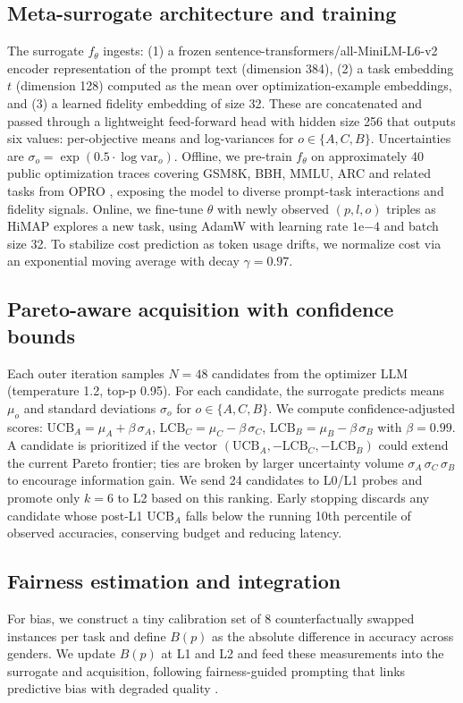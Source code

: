 \documentclass{article}
\begin{document}
\subsection{Meta-surrogate architecture and training}
The surrogate \(f_{\theta}\) ingests: (1) a frozen sentence-transformers/all-MiniLM-L6-v2 encoder representation of the prompt text (dimension 384), (2) a task embedding \(t\) (dimension 128) computed as the mean over optimization-example embeddings, and (3) a learned fidelity embedding of size 32. These are concatenated and passed through a lightweight feed-forward head with hidden size 256 that outputs six values: per-objective means and log-variances for \(o \in \{A, C, B\}\). Uncertainties are \(\sigma_o = \exp(0.5\cdot\log\mathrm{var}_o)\). Offline, we pre-train \(f_{\theta}\) on approximately 40 public optimization traces covering GSM8K, BBH, MMLU, ARC and related tasks from OPRO \cite{yang-2023-large}, exposing the model to diverse prompt-task interactions and fidelity signals. Online, we fine-tune \(\theta\) with newly observed \((p, l, o)\) triples as HiMAP explores a new task, using AdamW with learning rate \(1\mathrm{e}{-4}\) and batch size 32. To stabilize cost prediction as token usage drifts, we normalize cost via an exponential moving average with decay \(\gamma = 0.97\).

\subsection{Pareto-aware acquisition with confidence bounds}
Each outer iteration samples \(N = 48\) candidates from the optimizer LLM (temperature 1.2, top-p 0.95). For each candidate, the surrogate predicts means \(\mu_o\) and standard deviations \(\sigma_o\) for \(o \in \{A, C, B\}\). We compute confidence-adjusted scores: \(\mathrm{UCB}_A = \mu_A + \beta\,\sigma_A\), \(\mathrm{LCB}_C = \mu_C - \beta\,\sigma_C\), \(\mathrm{LCB}_B = \mu_B - \beta\,\sigma_B\) with \(\beta = 0.99\). A candidate is prioritized if the vector \((\mathrm{UCB}_A, -\mathrm{LCB}_C, -\mathrm{LCB}_B)\) could extend the current Pareto frontier; ties are broken by larger uncertainty volume \(\sigma_A\,\sigma_C\,\sigma_B\) to encourage information gain. We send 24 candidates to L0/L1 probes and promote only \(k = 6\) to L2 based on this ranking. Early stopping discards any candidate whose post-L1 \(\mathrm{UCB}_A\) falls below the running 10th percentile of observed accuracies, conserving budget and reducing latency.

\subsection{Fairness estimation and integration}
For bias, we construct a tiny calibration set of 8 counterfactually swapped instances per task and define \(B(p)\) as the absolute difference in accuracy across genders. We update \(B(p)\) at L1 and L2 and feed these measurements into the surrogate and acquisition, following fairness-guided prompting that links predictive bias with degraded quality \cite{ma-2023-fairness}.
\end{document}
